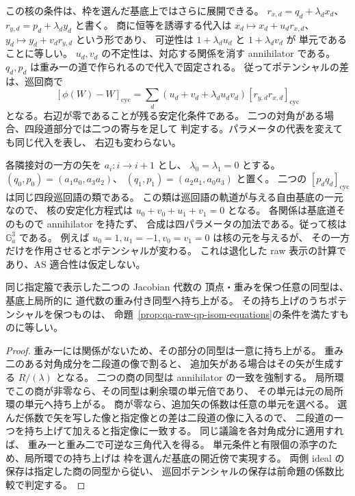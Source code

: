 この核の条件は、枠を選んだ基底上ではさらに展開できる。
$r_{x,d}=q_d+\lambda_d x_d$、
$r_{y,d}=p_d+\lambda_d y_d$ と書く。
商に恒等を誘導する代入は
$x_d\mapsto x_d+u_dr_{x,d}$、
$y_d\mapsto y_d+v_dr_{y,d}$ という形であり、
可逆性は $1+\lambda_d u_d$ と $1+\lambda_d v_d$ が
単元であることに等しい。
$u_d,v_d$ の不定性は、対応する関係を消す annihilator である。
$q_d,p_d$ は重み一の道で作られるので代入で固定される。
従ってポテンシャルの差は、巡回商で
\[
  [\phi(W)-W]_{\mathrm{cyc}}
   =\sum_d (u_d+v_d+\lambda_du_dv_d)
                     [r_{y,d}r_{x,d}]_{\mathrm{cyc}}
\]
となる。右辺が零であることが残る安定化条件である。
二つの対角がある場合、四段道部分では二つの寄与を足して
判定する。パラメータの代表を変えても同じ代入を表し、
右辺も変わらない。

\begin{example}[二つの対角にまたがる核の条件]
各隣接対の一方の矢を $a_i:i\to i+1$ とし、
$\lambda_0=\lambda_1=0$ とする。
$(q_0,p_0)=(a_1a_0,a_3a_2)$、
$(q_1,p_1)=(a_2a_1,a_0a_3)$ と置く。
二つの $[p_dq_d]_{\mathrm{cyc}}$ は同じ四段巡回語の類である。
この類は巡回語の軌道が与える自由基底の一元なので、
核の安定化方程式は
$u_0+v_0+u_1+v_1=0$ となる。
各関係は基底道そのもので annihilator を持たず、
合成は四パラメータの加法である。従って核は $\mathbb G_a^3$ である。
例えば $u_0=1,u_1=-1,v_0=v_1=0$ は核の元を与えるが、
その一方だけを作用させるとポテンシャルが変わる。
これは退化した raw 表示の計算であり、AS 適合性は仮定しない。
\end{example}

\begin{proposition}
同じ指定箙で表示した二つの Jacobian 代数の
頂点・重みを保つ任意の同型は、基底上局所的に
道代数の重み付き同型へ持ち上がる。
その持ち上げのうちポテンシャルを保つものは、
命題~\ref{prop:qa-raw-qp-isom-equations}の条件を満たすものに等しい。
\end{proposition}
\begin{proof}
重み一には関係がないため、その部分の同型は一意に持ち上がる。
重み二のある対角成分を二段道の像で割ると、
追加矢がある場合はその矢が生成する $R/(\lambda)$ となる。
二つの商の同型は annihilator の一致を強制する。
局所環でこの商が非零なら、その同型は剰余環の単元倍であり、
その単元は元の局所環の単元へ持ち上がる。
商が零なら、追加矢の係数は任意の単元を選べる。
選んだ係数で矢を写した像と指定像との差は二段道の像に入るので、
二段道の一つを持ち上げて加えると指定像に一致する。
同じ議論を各対角成分に適用すれば、
重み一と重み二で可逆な三角代入を得る。
単元条件と有限個の添字のため、局所環での持ち上げは
枠を選んだ基底の開近傍で実現する。
両側 ideal の保存は指定した商の同型から従い、
巡回ポテンシャルの保存は前命題の係数比較で判定する。
\end{proof}

